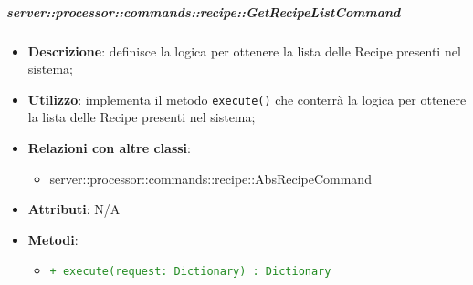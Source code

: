         \subparagraph{server::processor::commands::recipe::GetRecipeListCommand} %
        \label{subp:bdsm_app_server_processor_commands_recipe_getrecipelistcommand}
        \begin{itemize}
          \item \textbf{Descrizione}: definisce la logica per ottenere la lista delle Recipe presenti nel sistema;
          \item \textbf{Utilizzo}: implementa il metodo \texttt{execute()} che conterrà la logica per ottenere la lista delle Recipe presenti nel sistema;
          \item \textbf{Relazioni con altre classi}:
            \begin{itemize}
              \item server::processor::commands::recipe::AbsRecipeCommand
            \end{itemize}
          \item \textbf{Attributi}: N/A
          \item \textbf{Metodi}:
          \begin{itemize}
              \item \textcolor{forestgreen}{\texttt{+ execute(request: Dictionary) : Dictionary}}
          \end{itemize}
        \end{itemize}

